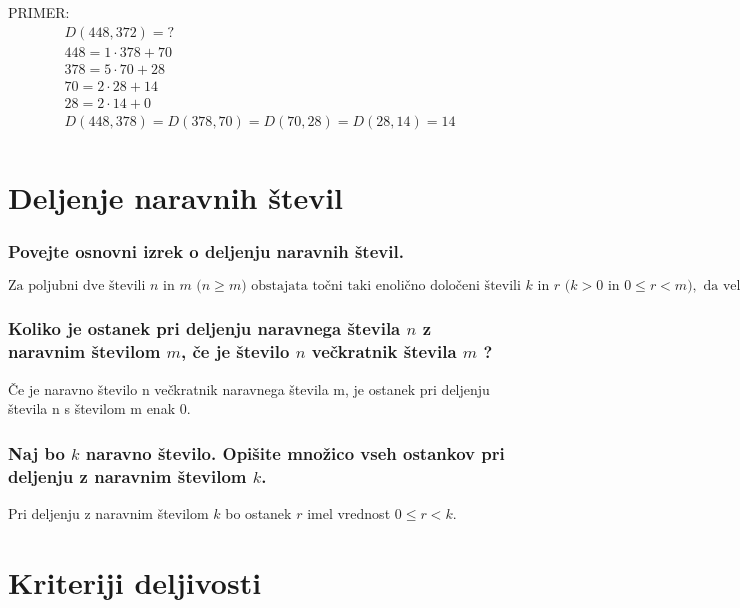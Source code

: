 \documentclass{article}
\begin{document}
PRIMER: 
\begin{gather*}
    D(448, 372) = ? \\
    448 = 1 \cdot 378 + 70 \\
    378 = 5 \cdot 70 + 28 \\
    70 = 2 \cdot 28 + 14 \\
    28 = 2 \cdot 14 + 0 \\
    D(448, 378) = D(378, 70) = D(70, 28) = D(28, 14) = 14 \\
\end{gather*}

\section{Deljenje naravnih števil}
\subsubsection*{Povejte osnovni izrek o deljenju naravnih števil.}
$\text{Za poljubni dve števili } n \text{ in } m \text{ (} n \geq m \text{) obstajata točni taki enolično določeni števili } k \text{ in } r \text{ (} k > 0 \text{ in } 0 \leq r < m \text{)}, \text{ da velja } n = k \cdot m + r.$

\subsubsection*{Koliko je ostanek pri deljenju naravnega števila $n$ z naravnim številom $m$, če je število $n$ večkratnik števila $m$ ?}
Če je naravno število n večkratnik naravnega števila m, je ostanek pri deljenju števila n s številom m enak 0.


\subsubsection*{Naj bo $k$ naravno število. Opišite množico vseh ostankov pri deljenju z naravnim številom $k$.}
Pri deljenju z naravnim številom $k$ bo ostanek $r$ imel vrednost $0 \leq r < k$. 


\section{Kriteriji deljivosti}
\end{document}

